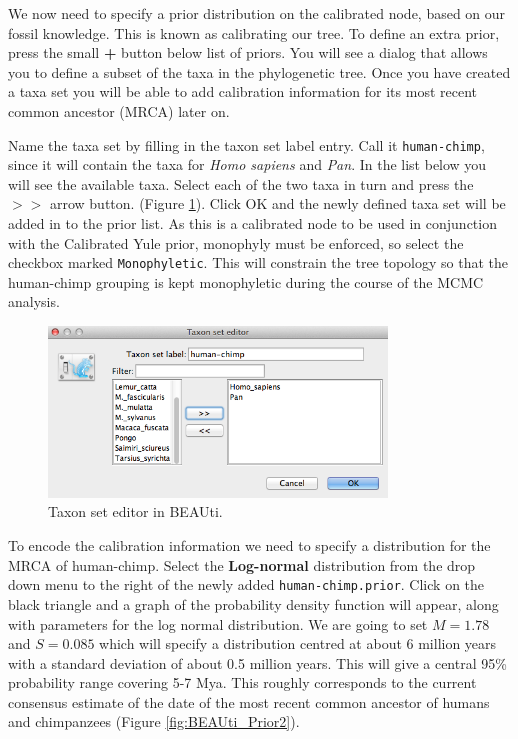 \documentclass[11pt]{article}
\theoremstyle{plain}%
\theoremstyle{definition}
\theoremstyle{remark}
\begin{document}
We now need to specify a prior distribution on the calibrated node, based on our
fossil knowledge. This is known as calibrating our tree. To define an extra prior, press the small {\bf +} button below list of priors. You will see a
dialog that allows you to define a subset of the taxa in the phylogenetic tree. Once you have created a taxa set you will be able to add calibration information for its most recent common
ancestor (MRCA) later on. 

Name the taxa set by filling in the taxon set label entry. 
Call it \texttt{human-chimp}, since it will contain the taxa for {\it Homo sapiens} and {\it Pan}. 
In the list below you will see the available taxa. Select each of the two taxa in turn and press the $> >$ arrow button. (Figure \ref{fig:BEAUti_TaxonSets}).
Click OK and the newly defined taxa set will be added in to the prior list.
As this is a calibrated node to be used in conjunction with the Calibrated Yule prior, monophyly must be enforced, so select the checkbox marked \texttt{Monophyletic}. This will constrain the tree topology so that the human-chimp grouping is kept monophyletic during the course of the MCMC analysis.

\begin{figure}
\centering
\includegraphics[width=9cm]{figures/BEAUti_TaxonSets}
\caption{Taxon set editor in BEAUti.}
\label{fig:BEAUti_TaxonSets}
\end{figure}

To encode the calibration information we need to specify a distribution for the MRCA of human-chimp.
Select the \textbf{Log-normal} distribution from the drop down menu to the right of the newly added \texttt{human-chimp.prior}. 
Click on the black triangle and a graph of the probability density function will appear, along with parameters for the log normal distribution.
We are going to set $M=1.78$ and $S=0.085$ which will specify a distribution centred at about 6 million
years with a standard deviation of about 0.5 million years. This will give
a central 95\% probability range covering 5-7 Mya. This roughly corresponds to the current consensus
estimate of the date of the most recent common ancestor of humans and chimpanzees (Figure \ref{fig:BEAUti_Prior2}).
\end{document}
